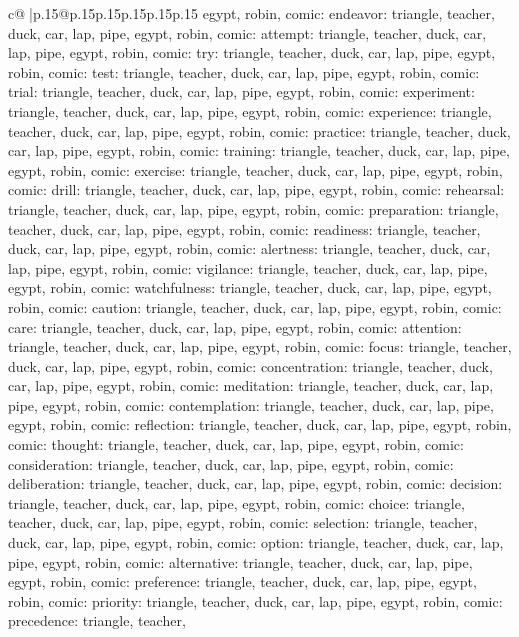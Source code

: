 \documentclass{article}
\begin{document}
{\begin{supertabular}{c@{$\;$}|p{.15\linewidth}@{}p{.15\linewidth}p{.15\linewidth}p{.15\linewidth}p{.15\linewidth}p{.15\linewidth}}
{{{egypt, robin, comic\n\nCLUE: endeavor\nTARGETS: triangle, teacher, duck, car, lap, pipe, egypt, robin, comic\n\nCLUE: attempt\nTARGETS: triangle, teacher, duck, car, lap, pipe, egypt, robin, comic\n\nCLUE: try\nTARGETS: triangle, teacher, duck, car, lap, pipe, egypt, robin, comic\n\nCLUE: test\nTARGETS: triangle, teacher, duck, car, lap, pipe, egypt, robin, comic\n\nCLUE: trial\nTARGETS: triangle, teacher, duck, car, lap, pipe, egypt, robin, comic\n\nCLUE: experiment\nTARGETS: triangle, teacher, duck, car, lap, pipe, egypt, robin, comic\n\nCLUE: experience\nTARGETS: triangle, teacher, duck, car, lap, pipe, egypt, robin, comic\n\nCLUE: practice\nTARGETS: triangle, teacher, duck, car, lap, pipe, egypt, robin, comic\n\nCLUE: training\nTARGETS: triangle, teacher, duck, car, lap, pipe, egypt, robin, comic\n\nCLUE: exercise\nTARGETS: triangle, teacher, duck, car, lap, pipe, egypt, robin, comic\n\nCLUE: drill\nTARGETS: triangle, teacher, duck, car, lap, pipe, egypt, robin, comic\n\nCLUE: rehearsal\nTARGETS: triangle, teacher, duck, car, lap, pipe, egypt, robin, comic\n\nCLUE: preparation\nTARGETS: triangle, teacher, duck, car, lap, pipe, egypt, robin, comic\n\nCLUE: readiness\nTARGETS: triangle, teacher, duck, car, lap, pipe, egypt, robin, comic\n\nCLUE: alertness\nTARGETS: triangle, teacher, duck, car, lap, pipe, egypt, robin, comic\n\nCLUE: vigilance\nTARGETS: triangle, teacher, duck, car, lap, pipe, egypt, robin, comic\n\nCLUE: watchfulness\nTARGETS: triangle, teacher, duck, car, lap, pipe, egypt, robin, comic\n\nCLUE: caution\nTARGETS: triangle, teacher, duck, car, lap, pipe, egypt, robin, comic\n\nCLUE: care\nTARGETS: triangle, teacher, duck, car, lap, pipe, egypt, robin, comic\n\nCLUE: attention\nTARGETS: triangle, teacher, duck, car, lap, pipe, egypt, robin, comic\n\nCLUE: focus\nTARGETS: triangle, teacher, duck, car, lap, pipe, egypt, robin, comic\n\nCLUE: concentration\nTARGETS: triangle, teacher, duck, car, lap, pipe, egypt, robin, comic\n\nCLUE: meditation\nTARGETS: triangle, teacher, duck, car, lap, pipe, egypt, robin, comic\n\nCLUE: contemplation\nTARGETS: triangle, teacher, duck, car, lap, pipe, egypt, robin, comic\n\nCLUE: reflection\nTARGETS: triangle, teacher, duck, car, lap, pipe, egypt, robin, comic\n\nCLUE: thought\nTARGETS: triangle, teacher, duck, car, lap, pipe, egypt, robin, comic\n\nCLUE: consideration\nTARGETS: triangle, teacher, duck, car, lap, pipe, egypt, robin, comic\n\nCLUE: deliberation\nTARGETS: triangle, teacher, duck, car, lap, pipe, egypt, robin, comic\n\nCLUE: decision\nTARGETS: triangle, teacher, duck, car, lap, pipe, egypt, robin, comic\n\nCLUE: choice\nTARGETS: triangle, teacher, duck, car, lap, pipe, egypt, robin, comic\n\nCLUE: selection\nTARGETS: triangle, teacher, duck, car, lap, pipe, egypt, robin, comic\n\nCLUE: option\nTARGETS: triangle, teacher, duck, car, lap, pipe, egypt, robin, comic\n\nCLUE: alternative\nTARGETS: triangle, teacher, duck, car, lap, pipe, egypt, robin, comic\n\nCLUE: preference\nTARGETS: triangle, teacher, duck, car, lap, pipe, egypt, robin, comic\n\nCLUE: priority\nTARGETS: triangle, teacher, duck, car, lap, pipe, egypt, robin, comic\n\nCLUE: precedence\nTARGETS: triangle, teacher, }}}
\end{supertabular}}
\end{document}
